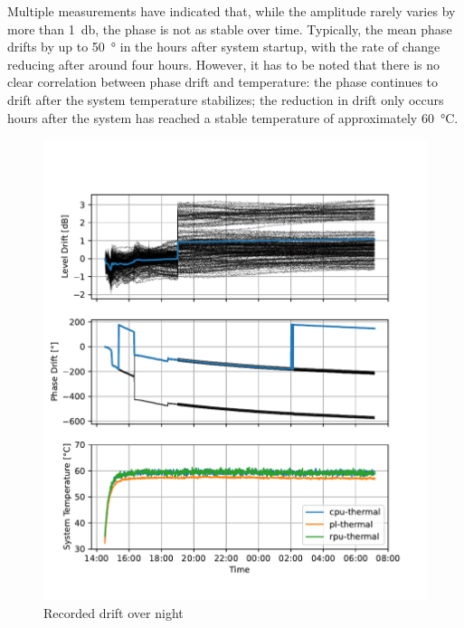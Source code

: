 Multiple measurements have indicated that, while the amplitude rarely varies by more than \SI{1}{\decibel}, the phase is not as stable over time.
Typically, the mean phase drifts by up to \SI{50}{\degree} in the hours after system startup, with the rate of change reducing after around four hours.
However, it has to be noted that there is no clear correlation between phase drift and temperature:
the phase continues to drift after the system temperature stabilizes;
the reduction in drift only occurs hours after the system has reached a stable temperature of approximately \SI{60}{\celsius}.

\begin{figure}
    \centering
    \includegraphics[width=\textwidth]{../figures/meas_23-10-09_phase_drift.pdf}
    \caption{Recorded drift over night}
    \label{fig:weekend}
\end{figure}

